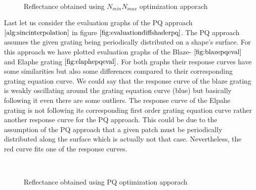 \begin{figure}[H]
  \centering
~
\caption{Reflectance obtained using $N_{min} N_{max}$ optimization apporach}
\label{fig:evaluationdiffshadernminmax}
\end{figure}

Last let us consider the evaluation graphs of the PQ approach $\ref{alg:sincinterpolation}$ in figure $\ref{fig:evaluationdiffshaderpq}$. The PQ approach assumes the given grating being periodically distributed on a shape's surface. For this approach we have plotted evaluation graphs of the Blaze- $\ref{fig:blazepqeval}$ and Elaphe grating $\ref{fig:elaphepqeval}$. For both graphs their response curves have some similarities but also some differences compared to their corresponding grating equation curve. We could say that the response curve of the blaze grating is weakly oscillating around the grating equation curve (blue) but basically following it even there are some outliers. The response curve of the Elpahe grating is not following its corresponding first order grating equation curve rather another response curve for the PQ approach. This could be due to the assumption of the PQ approach that a given patch must be periodically distributed along the surface which is actually not that case. Nevertheless, the red curve fits one of the response curves. 

\begin{figure}[H]
  \centering
~
\caption{Reflectance obtained using PQ optimization apporach}
\label{fig:evaluationdiffshaderpq}
\end{figure}


